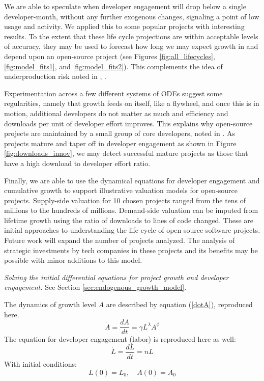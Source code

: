 \documentclass[conference]{IEEEtran}
\begin{document}
We are able to speculate when developer engagement will drop below a single developer-month, without any further exogenous changes, signaling a point of low usage and activity.  We applied this to some popular projects with interesting results. To the extent that these life cycle projections are within acceptable levels of accuracy, they may be used to forecast how long we may expect growth in and depend upon  an open-source project (see Figures \ref{fig:all_lifecycles}, \ref{fig:model_fits1}, and \ref{fig:model_fits2}). This complements the idea of underproduction risk noted in \cite{champion_underproduction_2021}, \cite{gaughan_engineering_2024}.

Experimentation across a few different systems of ODEs suggest some regularities, namely that growth feeds on itself, like a flywheel, and once this is in motion, additional developers do not matter as much and efficiency and downloads per unit of developer effort improves. This explains why open-source projects are maintained by a small group of core developers, noted in \cite{droesch_measuring_2020}. As projects mature and taper off in developer engagement as shown in Figure \ref{fig:downloads_innov}, we may detect successful mature projects as those that have a high download to developer effort ratio.

Finally, we are able to use the dynamical equations for developer engagement and cumulative growth to support illustrative valuation models for open-source projects. Supply-side valuation for 10 chosen projects ranged from the tens of millions to the hundreds of millions. Demand-side valuation can be imputed from lifetime growth using the ratio of downloads to lines of code changed. These are initial approaches to understanding the life cycle of open-source software projects. Future work will expand the number of projects analyzed. The analysis of strategic investments by tech companies in these projects and its benefits may be possible with minor additions to this model. 
 


 



\appendix

{\it Solving the initial differential equations for project growth and developer engagement.} See Section \ref{sec:endogenous_growth_model}.

The dynamics of growth level $A$ are described by equation (\ref{dotA}), reproduced here.    
\begin{equation}
{\dot A} = \frac{dA}{dt} = \gamma L^{\lambda} A^{\phi} \end{equation}
The equation for developer engagement (labor) is reproduced here as well:
\begin{equation}
{\dot L} = \frac{dL}{dt} = n L  \label{dotL}
\end{equation}
With initial conditions:
$$
L(0) = L_0, \quad A(0) = A_0
$$
\end{document}
